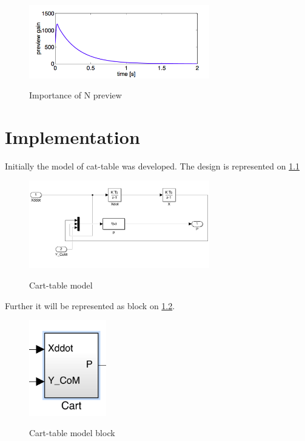 \documentclass[12pt,a4paper]{report}
\begin{document}
			\begin{figure}[h!]
				\vspace{-0.2cm}
				\centering
				{\includegraphics[width=0.7\textwidth]{12}}
				\caption{Importance of N preview \cite{kajita2003biped}}
				\label{fig:12}
				\vspace{-0.1cm}
			\end{figure}
	\chapter{Implementation}
		Initially the model of cat-table was developed. The design is represented on \cref{fig:13}
		\begin{figure}[h!]
			\vspace{-0.2cm}
			\centering
			{\includegraphics[width=0.7\textwidth]{13}}
			\caption{Cart-table model}
			\label{fig:13}
			\vspace{-0.1cm}
		\end{figure}
		
		Further it will be represented as block on \cref{fig:14}.
		
		\begin{figure}[h!]
			\vspace{-0.2cm}
			\centering
			{\includegraphics[width=0.3\textwidth]{14}}
			\caption{Cart-table model block}
			\label{fig:14}
			\vspace{-0.1cm}
		\end{figure}
		
\end{document}
